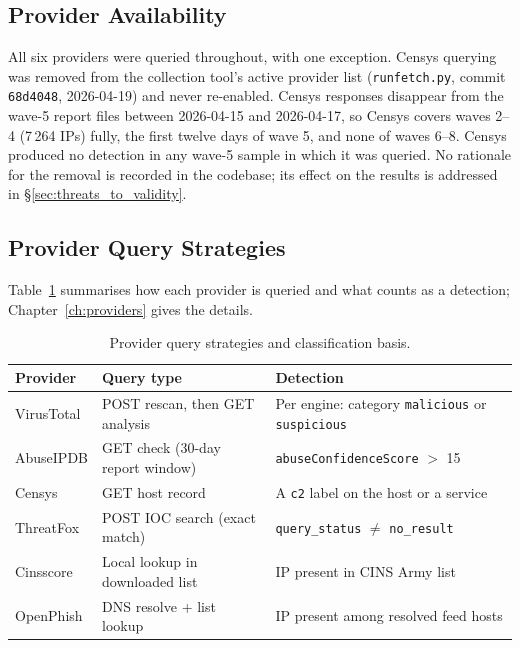 \subsection{Provider Availability}
\label{sec:provider_availability}

All six providers were queried throughout, with one exception. Censys querying was removed from the
collection tool's active provider list (\texttt{runfetch.py}, commit \texttt{68d4048}, 2026-04-19)
and never re-enabled. Censys responses disappear from the wave-5 report files between 2026-04-15 and
2026-04-17, so Censys covers waves 2--4 (7\,264 IPs) fully, the first twelve days of wave 5, and
none of waves 6--8. Censys produced no detection in any wave-5 sample in which it was queried. No
rationale for the removal is recorded in the codebase; its effect on the results is addressed in
\S\ref{sec:threats_to_validity}.

\subsection{Provider Query Strategies}

Table~\ref{tab:provider_queries} summarises how each provider is queried and what counts as a
detection; Chapter~\ref{ch:providers} gives the details.

\begin{table}[h]
  \centering
  \caption{Provider query strategies and classification basis.}
  \label{tab:provider_queries}
  \begin{tabularx}{\linewidth}{lXX}
    \toprule
    \textbf{Provider} & \textbf{Query type} & \textbf{Detection} \\
    \midrule
    VirusTotal  & POST rescan, then GET analysis & Per engine: category \texttt{malicious} or \texttt{suspicious} \\
    AbuseIPDB   & GET check (30-day report window) & \texttt{abuseConfidenceScore} $>$ 15 \\
    Censys      & GET host record                 & A \texttt{c2} label on the host or a service \\
    ThreatFox   & POST IOC search (exact match)   & \texttt{query\_status} $\neq$ \texttt{no\_result} \\
    Cinsscore   & Local lookup in downloaded list & IP present in CINS Army list \\
    OpenPhish   & DNS resolve + list lookup       & IP present among resolved feed hosts \\
    \bottomrule
  \end{tabularx}
\end{table}


